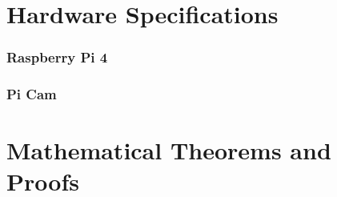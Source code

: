 \begin{appendices}

    \chapter{Hardware Specifications}
    \label{appendices:hardware_specs}
        \subsection{Raspberry Pi 4}


        \subsection{Pi Cam}

    \chapter{Mathematical Theorems and Proofs}

\end{appendices}